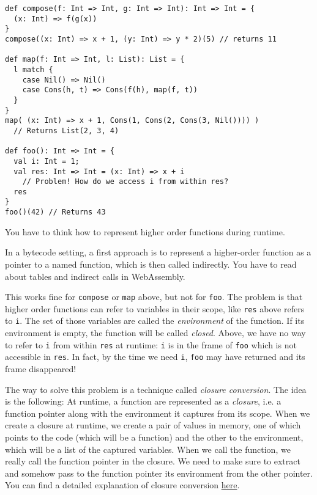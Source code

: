 \begin{lstlisting}
def compose(f: Int => Int, g: Int => Int): Int => Int = {
  (x: Int) => f(g(x))
}
compose((x: Int) => x + 1, (y: Int) => y * 2)(5) // returns 11

def map(f: Int => Int, l: List): List = {
  l match {
    case Nil() => Nil()
    case Cons(h, t) => Cons(f(h), map(f, t))
  }
}
map( (x: Int) => x + 1, Cons(1, Cons(2, Cons(3, Nil()))) )
  // Returns List(2, 3, 4)

def foo(): Int => Int = {
  val i: Int = 1;
  val res: Int => Int = (x: Int) => x + i
    // Problem! How do we access i from within res?
  res
}
foo()(42) // Returns 43

\end{lstlisting}

You have to think how to represent higher order functions during runtime.

In a bytecode setting,
a first approach is to represent a higher-order function as a pointer to
a named function, which is then called indirectly.
You have to read about tables and indirect calls in WebAssembly.

This works fine for \lstinline{compose} or \lstinline{map} above,
but not for \lstinline{foo}.
The problem is that higher order functions can refer to variables in their scope,
like \lstinline{res} above refers to \lstinline{i}.
The set of those variables are called the \emph{environment} of the function.
If its environment is empty, the function will be called \emph{closed}.
Above, we have no way to refer to \lstinline{i} from within \lstinline{res}
at runtime:
\lstinline{i} is in the frame of \lstinline{foo} which is not accessible in \lstinline{res}.
In fact, by the time we need \lstinline{i},
\lstinline{foo} may have returned and its frame disappeared!

The way to solve this problem is a technique called \emph{closure conversion}.
The idea is the following:
At runtime, a function are represented as a \emph{closure},
i.e. a function pointer along with the environment it captures from its scope.
When we create a closure at runtime, we create a pair of values in memory,
one of which points to the code (which will be a function)
and the other to the environment,
which will be a list of the captured variables.
When we call the function,
we really call the function pointer in the closure.
We need to make sure to extract and somehow pass to the function pointer
its environment from the other pointer.
You can find a detailed explanation of closure conversion
\href{https://cs420.epfl.ch/s/acc17_05_closure-conversion.pdf}{here}.

